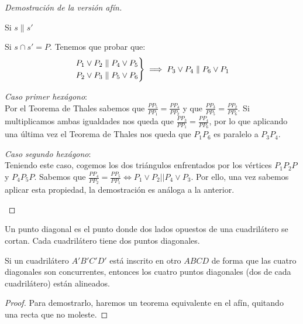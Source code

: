 \begin{proof}[Demostración de la versión afín]\hfill


\begin{nlist}
	\item Si $s \parallel s'$ %
	\item Si $s\cap s' = P$. Tenemos que probar que:
	$$\begin{rcases}
	P_1\vee P_2 \parallel P_4 \vee P_5\\
	P_2\vee P_3 \parallel P_5 \vee P_6
\end{rcases}\implies P_3 \vee P_4 \parallel P_6 \vee P_1 $$

\textit{Caso primer hexágono}:\\ %
Por el Teorema de Thales sabemos que $\frac{PP_5}{PP_1}=\frac{PP_4}{PP_2}$ y que $\frac{PP_3}{PP_5}=\frac{PP_2}{PP_6}$. Si multiplicamos ambas igualdades nos queda que $\frac{PP_3}{PP_1} = \frac{PP_4}{PP_6}$, por lo que aplicando una última vez el Teorema de Thales nos queda que $P_1 P_6$ es paralelo a $P_3 P_4$.

\textit{Caso segundo hexágono}:\\
Teniendo este caso, cogemos los dos triángulos enfrentados por los vértices $P_1P_2P$ y $P_4P_5P$.  Sabemos %
que $\frac{PP_4}{PP_2} = \frac{PP_5}{PP_1} \iff P_1\vee P_2 || P_4\vee P_3$. Por ello, una vez sabemos aplicar esta propiedad, la demostración es análoga a la anterior.
\end{nlist}
\end{proof}



\begin{ndef}
	Un punto diagonal es el punto donde dos lados opuestos de una cuadrilátero se cortan. Cada cuadrilátero tiene dos puntos diagonales.
\end{ndef}

\begin{nth}
    Si un cuadrilátero $A'B'C'D'$ está inscrito en otro $ABCD$ de forma que las cuatro diagonales son concurrentes, entonces los cuatro puntos diagonales (dos de cada cuadrilátero) están alineados.
\end{nth}

\begin{proof}
	Para demostrarlo, haremos un teorema equivalente en el afín, quitando una recta que no moleste.
\end{proof}


